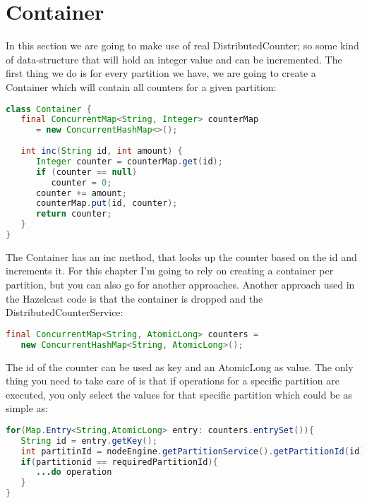 \section{Container}
In this section we are going to make use of real DistributedCounter; so some kind of data-structure that will hold an integer value and can be incremented. The first thing we do is for every partition we have, we are going to create a Container which will contain all counters for a given partition:
\begin{lstlisting}[language=java]
class Container {
   final ConcurrentMap<String, Integer> counterMap 
      = new ConcurrentHashMap<>();
   
   int inc(String id, int amount) {
      Integer counter = counterMap.get(id);
      if (counter == null) 
         counter = 0;
      counter += amount;
      counterMap.put(id, counter);
      return counter;
   }
}
\end{lstlisting}
The Container has an inc method, that looks up the counter based on the id and increments it. For this chapter I'm going to rely on creating a container per partition, but you can also go for another approaches. Another approach used in the Hazelcast code is that the container is dropped and the DistributedCounterService:
\begin{lstlisting}[language=java]
final ConcurrentMap<String, AtomicLong> counters = 
   new ConcurrentHashMap<String, AtomicLong>();
\end{lstlisting}
The id of the counter can be used as key and an AtomicLong as value. The only thing you need to take care of is that if operations for a specific partition are executed, you only select the values for that specific partition which could be as simple as: 
\begin{lstlisting}[language=java]
for(Map.Entry<String,AtomicLong> entry: counters.entrySet()){
   String id = entry.getKey();
   int partitinId = nodeEngine.getPartitionService().getPartitionId(id); 
   if(partitionid == requiredPartitionId){
      ...do operation	
   }
}
\end{lstlisting}

